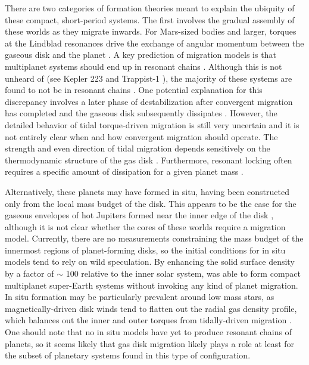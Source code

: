 There are two categories of formation theories meant to explain the ubiquity of these compact, short-period systems. The first 
involves the gradual assembly of these worlds as they migrate inwards. For Mars-sized bodies and larger, torques at the Lindblad 
resonances drive the exchange of angular momentum between the gaseous disk and the planet \cite{ward97}. A key prediction of 
migration models is that multiplanet systems should end up in resonant chains \cite{cresswell06}. Although this is not unheard of 
(see Kepler 223 \cite{mills16} and Trappist-1 \cite{gillon16, gillon17, agol21}), the majority of these systems are found to not be in 
resonant chains \cite{lissauer11, fabrycky14}. One potential explanation for this discrepancy involves a later phase of 
destabilization after convergent migration has completed and the gaseous disk subsequently dissipates 
\cite{izidoro17, izidoro21}. However, the detailed behavior of tidal torque-driven migration is still very uncertain and it is not 
entirely clear when and how convergent migration should operate. The strength and even direction of tidal migration depends 
sensitively on the thermodynamic structure of the gas disk \cite{ayliffe10, bitsch13}. Furthermore, resonant locking often requires a specific amount of dissipation for a given planet mass \cite{batygin23}.

Alternatively, these planets may have formed in situ, having been constructed only from the local mass budget of the disk. This 
appears to be the case for the gaseous envelopes of hot Jupiters formed near the inner edge of the disk \cite{bailey18}, although 
it is not clear whether the cores of these worlds require a migration model. Currently, there are no measurements constraining the 
mass budget of the innermost regions of planet-forming disks, so the initial conditions for in situ models tend to rely on wild 
speculation. By enhancing the solid surface density by a factor of $\sim$ 100 relative to the inner solar system, \cite{hansen12} 
was able to form compact multiplanet super-Earth systems without invoking any kind of planet migration. In situ formation may be 
particularly prevalent around low mass stars, as magnetically-driven disk winds tend to flatten out the radial gas density profile, 
which balances out the inner and outer torques from tidally-driven migration \cite{ogihara18}. One should note that no in situ 
models have yet to produce resonant chains of planets, so it seems likely that gas disk migration likely plays a role at least for the 
subset of planetary systems found in this type of configuration.

